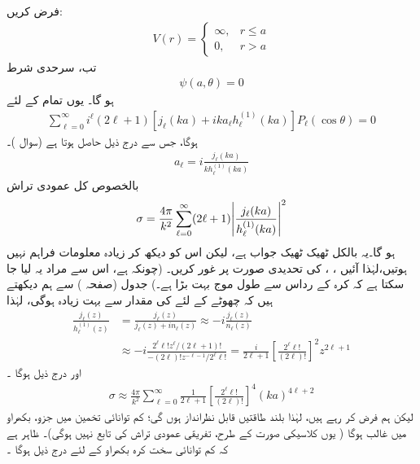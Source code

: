    فرض کریں:
\begin{align}
	V(r)=
	\begin{cases}
		\infty, & r\leq a  \\
		0, & r>a 
	\end{cases}
\end{align}
تب، سرحدی شرط 
\begin{align}
	\psi(a, \theta) = 0
\end{align}
ہو گا۔ یوں تمام  کے لئے
\begin{align}\label{مساوات_بکھراو_اے_ایل_الف}
	\sum_{\ell=0}^{\infty}i^{\ell}(2\ell+1)\left[j_{\ell}(ka)+ika_{\ell}h_{\ell}^{(1)}(ka)\right]P_{\ell}(\cos\theta) = 0
\end{align}
ہوگا، جس سے درج ذیل حاصل ہوتا ہے  (سوال )۔
\begin{align}\label{مساوات_بکھراو_اے_ایل_ب}
	a_{\ell} = i\frac{j_{\ell}(ka)}{kh_{\ell}^{(1)}(ka)}
\end{align}
بالخصوص کل عمودی تراش
\begin{align}
	\sigma=\frac{4\pi}{k^2}\sum_{\ell=0}^{\infty}(2\ell+1)\abs{\frac{j_{\ell}(ka)}{h_{\ell}^{(1)}(ka)}}^2
\end{align}
ہو گا۔یہ بالکل   ٹھیک ٹھیک  جواب ہے،  لیکن اس کو دیکھ کر زیادہ معلومات فراہم نہیں ہوتیں،لہٰذا  آئیں   ، ،  کی تحدیدی  صورت پر غور کریں۔ (چونکہ   ہے، اس سے مراد یہ لیا جا سکتا ہے کہ  کرہ کے رداس سے طول موج  بہت بڑا ہے۔)   جدول  (صفحہ )  سے  ہم دیکھتے ہیں کہ چھوٹے   کے لئے  کی مقدار  سے بہت زیادہ ہوگی، لہٰذا 
\begin{align}
	\frac{j_{\ell}(z)}{h_{\ell}^{(1)}(z)} &= \frac{j_{\ell}(z)}{j_{\ell}(z)+in_{\ell}(z)}\approx-i\frac{j_{\ell}(z)}{n_{\ell}(z)}\nonumber \\
	&\approx-i\frac{2^{\ell}\ell!z^{\ell}/(2\ell+1)!}{-(2\ell)!z^{-\ell-1}/2^{\ell}\ell!} = \frac{i}{2\ell+1}\left[\frac{2^{\ell}\ell!}{(2\ell)!}\right]^2z^{2\ell+1}
\end{align}
اور درج ذیل ہوگا ۔
\begin{align*}
	\sigma\approx\frac{4\pi}{k^2}\sum_{\ell=0}^{\infty}\frac{1}{2\ell+1}\left[\frac{2^{\ell}\ell!}{(2\ell)!}\right]^4(ka)^{4\ell+2}
\end{align*}
لیکن  ہم  فرض کر رہے ہیں،  لہٰذا بلند طاقتیں قابل نظرانداز ہوں گی؛  کم توانائی تخمین میں  جزو،  بکھراو میں غالب ہوگا ( یوں کلاسیکی صورت کے طرح،  تفریقی عمودی تراش  کی  تابع نہیں ہوگی)۔ ظاہر ہے کہ کم توانائی سخت کرہ بکھراو کے لئے درج ذیل ہوگا ۔
